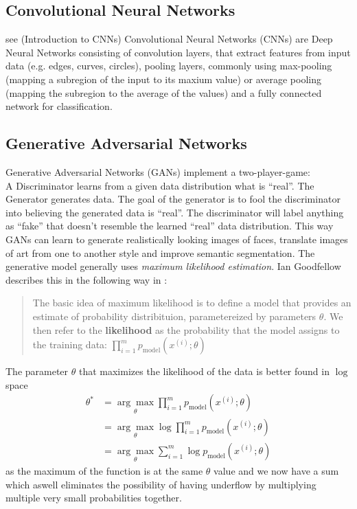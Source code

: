 \subsection{Convolutional Neural Networks}
see \cite{wu2017introduction} (Introduction to CNNs)
Convolutional Neural Networks (CNNs) are Deep Neural Networks consisting of convolution layers, that extract features from input data (e.g. edges, curves, circles), pooling layers, commonly using max-pooling (mapping a subregion of the input to its maxium value) or average pooling (mapping the subregion to the average of the values) and a fully connected network for classification. 






\subsection{Generative Adversarial Networks}
Generative Adversarial Networks (GANs) implement a two-player-game:\\
A Discriminator learns from a given data distribution what is ``real''. The Generator generates data. The goal of the generator is to fool the discriminator into believing the generated data is ``real''. The discriminator will label anything as ``fake'' that doesn't resemble the learned ``real'' data distribution. This way GANs can learn to generate realistically looking images of faces, translate images of art from one to another style and improve semantic segmentation.
The generative model generally uses \textit{maximum likelihood estimation}. Ian Goodfellow describes this in the following way in \cite{DBLP:journals/corr/Goodfellow17}:
\begin{quote}
	The basic idea of maximum likelihood is to define a model that provides an estimate of probability distribituion, parametereized by parameters $\theta$. We then refer to the \textbf{likelihood} as the probability that the model assigns to the training data: $\prod_{i=1}^{m}p_{\text{model}}(x^{(i)}; \theta)$
\end{quote}
The parameter $\theta$ that maximizes the likelihood of the data is better found in $\log$ space \cite{DBLP:journals/corr/Goodfellow17}
\begin{align}
	\theta^* &= \underset{\theta}{\arg \max} \prod_{i = 1}^{m} p_{\text{model}} (x^{(i)}; \theta)\\
	&= \underset{\theta}{\arg \max} \log \prod_{i=1}^{m} p_{\text{model}}(x^{(i)}; \theta)\\
	&= \underset{\theta}{\arg \max} \sum_{i = 1}^{m} \log p_{\text{model}}(x^{(i)}; \theta)
\end{align}
as the maximum of the function is at the same $\theta$ value and we now have a sum which aswell eliminates the possibility of having underflow by multiplying multiple very small probabilities together.



